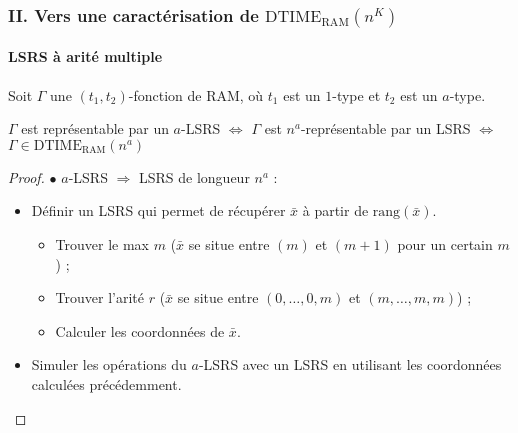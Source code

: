 \documentclass[10pt]{beamer}
\newcommand{\dtimeram}{\text{DTIME}_{\text{RAM}}\left( n^K \right)}
\newcommand{\dtimeramarg}[1]{\text{DTIME}_{\text{RAM}}\left( n^{#1} \right)}
\newcommand{\rang}[1]{\text{rang}\left( #1 \right)}
\begin{document}
	\begin{frame}
		\frametitle{II. Vers une caractérisation de $\dtimeram$}
		\framesubtitle{LSRS à arité multiple}
		
		\begin{thm}
			Soit $\Gamma$ une $(t_1,t_2)$-fonction de RAM, où $t_1$ est un $1$-type et $t_2$ est un $a$-type.
			
			$\Gamma$ est représentable par un $a$-LSRS $\Leftrightarrow$ $\Gamma$ est $n^a$-représentable par un LSRS $\Leftrightarrow$ $\Gamma \in \dtimeramarg{a}$
		\end{thm}
		
		\begin{proof}
				$\bullet$ $a$-LSRS $\Rightarrow$ LSRS de longueur $n^a$ :
			
				\begin{itemize}
					\item 	Définir un LSRS qui permet de récupérer $\bar{x}$ à partir de $\rang{\bar{x}}$.
					\pause 
					
					\begin{itemize}
						\item 	Trouver le max $m$ ($\bar{x}$ se situe entre $(m)$ et $(m+1)$ pour un certain $m$) ;
						\pause 
						\item 	Trouver l'arité $r$ ($\bar{x}$ se situe entre $(0, \dots, 0, m)$ et $(m, \dots, m, m)$) ;
						\pause 
						\item 	Calculer les coordonnées de $\bar{x}$.
					\end{itemize}
					\pause 
					\item	Simuler les opérations du $a$-LSRS avec un LSRS en utilisant les coordonnées calculées précédemment.
				\end{itemize}

		\end{proof}
	\end{frame}
	
\end{document}
